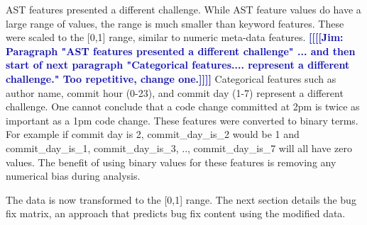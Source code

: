 \documentclass[10pt, conference, letterpaper, compsocconf]{IEEEtran}
\newcommand{\todoc}[2]{{\textcolor{#1} {\textbf{[[#2]]}}}}
\newcommand{\todored}[1]{\todoc{red}  {\textbf{[[#1]]}}}
\newcommand{\todoblue}[1]{\todoc{blue}{\textbf{[[#1]]}}}
\newcommand{\sung}[1]{\todored{Sung: #1}}
\newcommand{\jim}[1]{\todoblue{Jim: #1}}
\begin{document}
AST features presented a different challenge. While AST feature values
do have a large range of values, the range is much smaller than keyword
features. These were scaled to the [0,1] range, similar to numeric meta-data
features.
\jim{Paragraph "AST features presented a different challenge" ... and then start of next paragraph "Categorical features.... represent a different challenge." Too repetitive, change one.}
Categorical features such as author name, commit hour (0-23), and
commit day (1-7) represent a different challenge. One cannot conclude
that a code change committed at 2pm is twice as important as a 1pm
code change. These features were converted to binary terms. For example
if commit day is 2, commit\_day\_is\_2 would be 1 and commit\_day\_is\_1,
commit\_day\_is\_3, .., commit\_day\_is\_7 will all have zero values.
The benefit of using binary values for these features is removing
any numerical bias during analysis. 

The data is now transformed to the [0,1] range. The next section
details the bug fix matrix, an approach that predicts bug fix content using the modified data.

\end{document}
